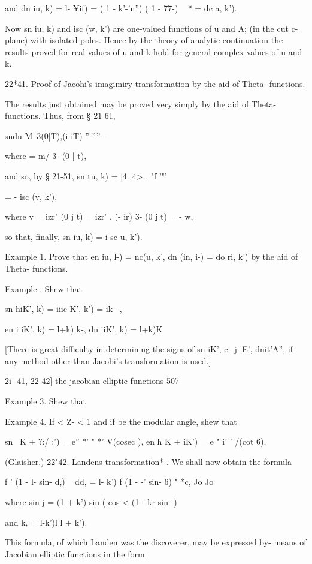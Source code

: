 and dn iu, k) = l- ¥if) = ( 1 - k'-'n'') ( 1 - 77-) ~ * = dc a, k').

Now sn iu, k) and isc (w, k') are one-valued functions of u and A; (in
the cut c-plane) with isolated poles. Hence by the theory of analytic
continuation the results proved for real values of u and k hold for
general complex values of u and k.

22*41. Proof of Jacohi's imagimiry transformation by the aid of Theta-
functions.

The results just obtained may be proved very simply by the aid of
Theta-functions. Thus, from § 21 61,

sndu M\ 3(0|T),(i iT) '' '''' -%

where = m/ 3- (0 | t),

and so, by § 21-51, sn tu, k) = |4 |4> . "f '"'

= - isc (v, k'),

where v = izr" (0 j t) = izr' . (- ir) 3- (0 j t) = - w,

so that, finally, sn iu, k) = i sc u, k').

Example 1. Prove that en iu, l-) = nc(u, k', dn (in, i-) = do ri, k')
by the aid of Theta- functions.

Example . Shew that

sn hiK', k) = iiic K', k') = ik~-,

en i iK', k) = l+k) k-, dn iiK', k) = l+k)K

[There is great difficulty in determining the signs of sn iK', ci\ j
iE', dnit'A'', if any method other than Jaeobi's transformation is
used.]

2i -41, 22-42] the jacobian elliptic functions 507

Example 3. Shew that

Example 4. If < Z- < 1 and if be the modular angle, shew that

sn \ K + ?:/ :') = e'' *' " *' V(cosec ), en h K + iK') = e " i' '
/(cot 6),

(Glaisher.) 22"42. Landens transformation* . We shall now obtain the
formula

f ' (1 - l- sin- d,) ~ dd, = l- k') f (1 - -' sin- 6) " *c, Jo Jo

where sin j = (1 + k') sin ( cos < (1 - kr sin- ) ~

and k, = l-k')l l + k').

This formula, of which Landen was the discoverer, may be expressed by-
means of Jacobian elliptic functions in the form

